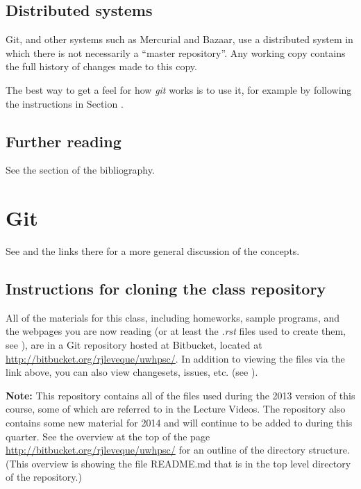\documentclass[letterpaper,10pt,english]{sphinxmanual}
\begin{document}
\subsection{Distributed systems}
\label{versioncontrol:distributed-systems}
Git, and other systems such as Mercurial and Bazaar, use a distributed
system in which there is not necessarily a ``master repository''.  Any working
copy contains the full history of changes made to this copy.

The best way to get a feel for how \emph{git} works is to use it, for example
by following the instructions in Section {\hyperref[git:git]{}}.


\subsection{Further reading}
\label{versioncontrol:further-reading}
See the {\hyperref[biblio:biblio\string-vcs]{}} section of the bibliography.


\section{Git}
\label{git:git}\label{git::doc}\label{git:id1}
See {\hyperref[versioncontrol:versioncontrol]{}} and the links there
for a more general discussion of the concepts.


\subsection{Instructions for cloning the class repository}
\label{git:classgit}\label{git:instructions-for-cloning-the-class-repository}
All of the materials for this class, including homeworks, sample programs,
and the webpages you are now
reading (or at least the \emph{.rst} files used to create them, see
{\hyperref[sphinx:sphinx]{}}), are in a Git repository hosted at Bitbucket, located
at
\url{http://bitbucket.org/rjleveque/uwhpsc/}.
In addition to viewing the files via the link above, you can also view
changesets, issues, etc. (see {\hyperref[bitbucket:bitbucket]{}}).

\textbf{Note:} This repository contains all of the files used during the 2013
version of this course, some of which are referred to in the Lecture Videos.
The repository also contains some new material for 2014 and will continue to
be added to during this quarter. See the overview at the top of the page
\url{http://bitbucket.org/rjleveque/uwhpsc/}
for an outline of the directory structure.  (This overview is showing the
file README.md that is in the top level directory of the repository.)
\end{document}
